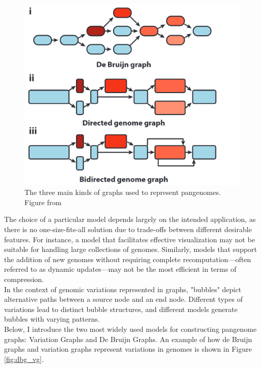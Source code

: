\begin{figure}[h!]
	\centering
	\includegraphics[width=.75\linewidth]{figures/background/graph_types.png}
	\caption[Graph pangenome models.]{The three main kinds of graphs used to represent pangenomes. Figure from~\cite{eizenga}}
	\label{fig:graph_types.png}
\end{figure}
The choice of a particular model depends largely on the intended application, as there is no one-size-fits-all solution due to trade-offs between different desirable features. For instance, a model that facilitates effective visualization may not be suitable for handling large collections of genomes. Similarly, models that support the addition of new genomes without requiring complete recomputation—often referred to as dynamic updates—may not be the most efficient in terms of compression.\\
In the context of genomic variations represented in graphs, "bubbles" depict alternative paths between a source node and an end node. Different types of variations lead to distinct bubble structures, and different models generate bubbles with varying patterns.\\
Below, I introduce the two most widely used models for constructing pangenome graphs: Variation Graphs and De Bruijn Graphs. An example of how de Bruijn graphs and variation graphs represent variations in genomes is shown in Figure \ref{fig:dbg_vg}.

